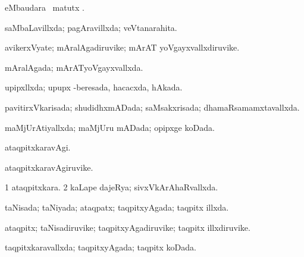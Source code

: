 {{\bentry
{} 
\gl{\sakirx}
\expl{}
\bmng
{} eMbaudara \BU\ matutx \BUkaq. 
\emng
\eentry

\bentry
{} 
\gl{\gu}
\expl{}
\bmng
saMbaLavillxda; pagAravillxda; veVtanarahita. 
\emng
\eentry

\bentry
{} 
\gl{\nA}
\expl{}
\bmng
avikerxVyate; mAralAgadiruvike; mArAT yoVgayxvallxdiruvike. 
\emng
\eentry

\bentry
{} 
\gl{\gu}
\expl{}
\bmng
mAralAgada; mArATyoVgayxvallxda. 
\emng
\eentry

\bentry
{} 
\gl{\gu}
\expl{}
\bmng
upipxllxda; upupx -beresada, hacacxda, hAkada. 
\emng
\eentry

\bentry
{} 
\gl{\gu}
\expl{}
\bmng
pavitirxVkarisada; shudidhxmADada; saMsakxrisada; dhamaRsamamxtavallxda. 
\emng
\eentry

\bentry
{} 
\gl{\gu}
\expl{}
\bmng
maMjUrAtiyallxda; maMjUru mADada; opipxge koDada. 
\emng
\eentry

\bentry
{} 
\gl{\gu}
\expl{}
\bmng
{} 
\emng
\eentry

\bentry
{} 
\gl{\kirxvi}
\expl{}
\bmng
ataqpitxkaravAgi. 
\emng
\eentry

\bentry
{} 
\gl{\nA}
\expl{}
\bmng
ataqpitxkaravAgiruvike. 
\emng
\eentry

\bentry
{} 
\gl{\gu}
\expl{}
\bmng
\bnum
\num{1} ataqpitxkara. 
\num{2} kaLape dajeRya; sivxVkArAhaRvallxda. 
\enum
\emng
\eentry

\bentry
{} 
\gl{\gu}
\expl{}
\bmng
taNisada; taNiyada; ataqpatx; taqpitxyAgada; taqpitx illxda. 
\emng
\eentry

\bentry
{} 
\gl{\nA}
\expl{}
\bmng
ataqpitx; taNisadiruvike; taqpitxyAgadiruvike; taqpitx illxdiruvike. 
\emng
\eentry

\bentry
{} 
\gl{\gu}
\expl{}
\bmng
taqpitxkaravallxda; taqpitxyAgada; taqpitx koDada. 
\emng
\eentry

}}
